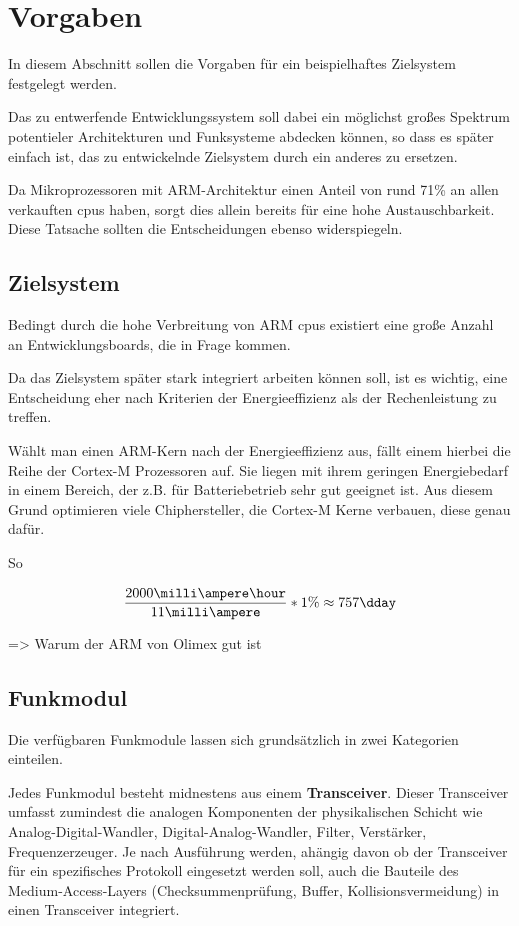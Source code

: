 \section{Vorgaben} In diesem Abschnitt sollen die Vorgaben für ein
beispielhaftes Zielsystem festgelegt werden. 

Das zu entwerfende Entwicklungssystem soll dabei ein möglichst großes Spektrum
potentieler Architekturen und Funksysteme abdecken können, so dass es später
einfach ist, das zu entwickelnde Zielsystem durch ein anderes zu ersetzen.

Da Mikroprozessoren mit ARM-Architektur einen Anteil von rund 71\%\cite{IDC01}
an allen verkauften \glspl{cpu} haben, sorgt dies allein bereits für eine hohe
Austauschbarkeit. Diese Tatsache sollten die Entscheidungen ebenso
widerspiegeln.
\subsection{Zielsystem} Bedingt durch die hohe Verbreitung von ARM \glspl{cpu}
existiert eine große Anzahl an Entwicklungsboards, die in Frage kommen.

Da das Zielsystem später stark integriert arbeiten können soll, ist es wichtig,
eine Entscheidung eher nach Kriterien der Energieeffizienz als der
Rechenleistung zu treffen.

Wählt man einen ARM-Kern nach der Energieeffizienz aus, fällt einem hierbei die
Reihe der Cortex-M Prozessoren auf. Sie liegen mit ihrem geringen Energiebedarf
in einem Bereich, der z.B. für Batteriebetrieb sehr gut geeignet ist. Aus diesem
Grund optimieren viele Chiphersteller, die Cortex-M Kerne verbauen, diese genau dafür.

So 

\begin{equation}\begin{split}
\frac{2000\milli\ampere\hour}{11 \milli\ampere}*1\% \approx 757 \dday
\end{split}\end{equation}


 => Warum der ARM von Olimex gut ist
\subsection{Funkmodul} Die verfügbaren Funkmodule lassen sich grundsätzlich in
zwei Kategorien einteilen.

Jedes Funkmodul besteht midnestens aus einem \textbf{Transceiver}. Dieser
Transceiver umfasst zumindest die analogen Komponenten der physikalischen
Schicht wie Analog-Digital-Wandler, Digital-Analog-Wandler, Filter, Verstärker,
Frequenzerzeuger. Je nach Ausführung werden, ahängig davon ob der Transceiver
für ein spezifisches Protokoll eingesetzt werden soll, auch die Bauteile des
Medium-Access-Layers (Checksummenprüfung, Buffer, Kollisionsvermeidung) in
einen Transceiver integriert.

